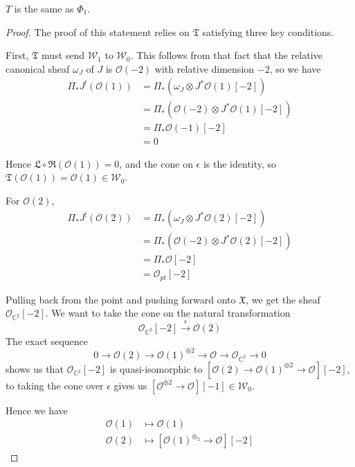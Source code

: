 \begin{theorem}{\cite{donovan_window_2014}}{}
	 $T$ is the same as $\Phi_1$. 
\end{theorem}

\begin{proof}
	
The proof of this statement relies on $\mathfrak{T}$ satisfying three key conditions. 

First, $\mathfrak{T}$ must send $\mathcal{W}_1$ to $\mathcal{W}_{0}$. This follows from that fact that the relative canonical sheaf $\omega_J$ of $J$ is $\mathcal{O}(-2)$ with relative dimension $-2$, so we have 
\begin{align*}
\Pi_{*}J^{!}(\mathcal{O}(1)) &= \Pi_{*}\left(\omega_{J}\otimes  J^{*} \mathcal{O}(1)[-2] \right) \\
&= \Pi_{*}\left( \mathcal{O}(-2)\otimes  J^{*}\mathcal{O}(1)[-2] \right) \\
&= \Pi_{*}\mathcal{O}(-1)[-2] \\
&=0  
\end{align*}

Hence $\mathfrak{L} \circ \mathfrak{R} (\mathcal{O}(1))=0$, and the cone on $\epsilon$ is the identity, so $\mathfrak{T}(\mathcal{O}(1)) = \mathcal{O}(1)\in \mathcal{W_0}$.

For $\mathcal{O}(2)$, 
\begin{align*}
\Pi_{*}J^{!}(\mathcal{O}(2)) &= \Pi_{*}\left(\omega_{J}\otimes  J^{*} \mathcal{O}(2)[-2] \right) \\
&= \Pi_{*}\left( \mathcal{O}(-2)\otimes  J^{*}\mathcal{O}(2)[-2] \right) \\
&= \Pi_{*}\mathcal{O}[-2] \\
&= \mathcal{O}_{pt}[-2]
\end{align*}

Pulling back from the point and pushing forward onto $\mathfrak{X}$, we get the sheaf $\mathcal{O}_{\mathbb{C}^{2}}[-2]$. We want to take the cone on the natural transformation $$
\mathcal{O}_{\mathbb{C}^2}[-2]\xrightarrow{\epsilon} \mathcal{O}(2)
$$ The exact sequence $$
0 \to \mathcal{O}(2)\to \mathcal{O}(1) ^{\oplus 2} \to \mathcal{O} \to \mathcal{O}_{\mathbb{C}^{2}}\to 0
$$ shows us that $\mathcal{O}_{\mathbb{C}^2}[-2]$ is quasi-isomorphic to $\left[ \mathcal{O}(2)\to \mathcal{O}(1)^{\oplus{2}}\to \mathcal{O} \right][-2]$, to taking the cone over $\epsilon$ gives us $\left[ \mathcal{O}^{\oplus{2}}\to \mathcal{O} \right][-1] \in \mathcal{W}_0.$

Hence we have 
\begin{align*}
\mathcal{O}(1) &\mapsto \mathcal{O}(1) \\
\mathcal{O}(2) &\mapsto \left[ \mathcal{O}(1)^{\oplus_{2}}\to \mathcal{O} \right][-2] 
\end{align*}


\end{proof}

